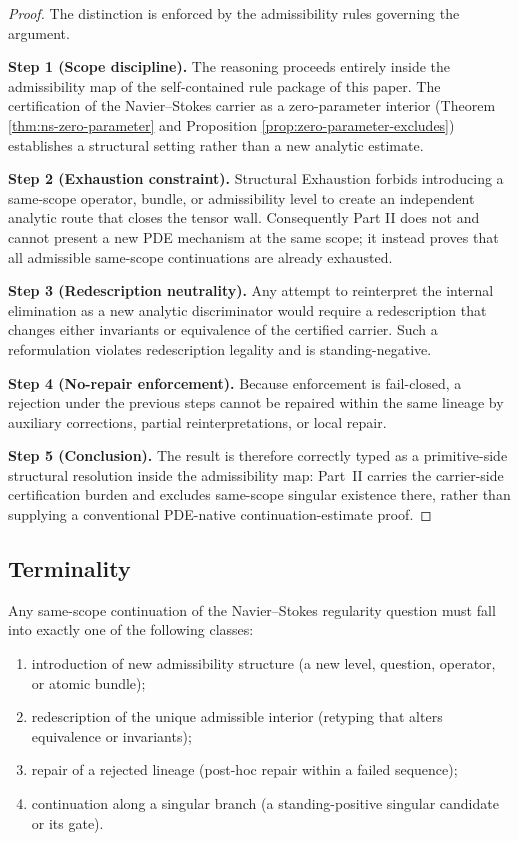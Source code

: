\begin{proof}
The distinction is enforced by the admissibility rules governing the argument.

\textbf{Step 1 (Scope discipline).} The reasoning proceeds entirely inside the admissibility map of
the self-contained rule package of this paper. The certification of the Navier--Stokes carrier as a zero-parameter interior
(Theorem \ref{thm:ns-zero-parameter} and Proposition \ref{prop:zero-parameter-excludes}) establishes a
structural setting rather than a new analytic estimate.

\textbf{Step 2 (Exhaustion constraint).} Structural Exhaustion forbids introducing a same-scope
operator, bundle, or admissibility level to create an independent analytic route that closes the
tensor wall. Consequently Part II does not and cannot present a new PDE mechanism at the same scope;
it instead proves that all admissible same-scope continuations are already exhausted.

\textbf{Step 3 (Redescription neutrality).} Any attempt to reinterpret the internal elimination as a
new analytic discriminator would require a redescription that changes either invariants or
equivalence of the certified carrier. Such a reformulation violates redescription legality and is
standing-negative.

\textbf{Step 4 (No-repair enforcement).} Because enforcement is fail-closed, a rejection under the
previous steps cannot be repaired within the same lineage by auxiliary corrections, partial
reinterpretations, or local repair.

\textbf{Step 5 (Conclusion).} The result is therefore correctly typed as a primitive-side structural resolution inside the admissibility map: Part~II carries the carrier-side certification burden and excludes same-scope singular existence there, rather than supplying a conventional PDE-native continuation-estimate proof.
\end{proof}

\subsection{Terminality}
\begin{lemma}\label{lem:move-classification}
Any same-scope continuation of the Navier--Stokes regularity question must fall into exactly one of
the following classes:
\begin{enumerate}[label=(\roman*), leftmargin=2.2em]
\item introduction of new admissibility structure (a new level, question, operator, or atomic bundle);
\item redescription of the unique admissible interior (retyping that alters equivalence or invariants);
\item repair of a rejected lineage (post-hoc repair within a failed sequence);
\item continuation along a singular branch (a standing-positive singular candidate or its gate).
\end{enumerate}
\end{lemma}

